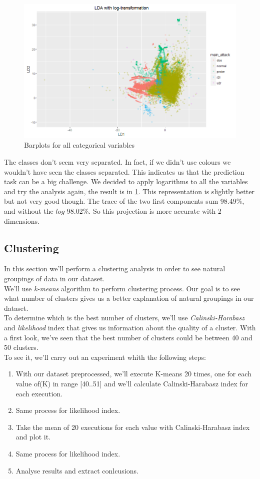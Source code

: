 \documentclass[a4paper]{article} %
\begin{document}
\begin{figure}[H]
	\centering
	\includegraphics[scale=0.45]{LDA_log.png}
	\caption{Barplots for all categorical variables}
	\label{fig:fda_log}
\end{figure}
The classes don't seem very separated. In fact, if we didn't use colours we wouldn't have seen the classes separated. This indicates us that the prediction task can be a big challenge. We decided to apply logarithms to all the variables and try the analysis again, the result is in \ref{fig:fda_log}. This representation is slightly better but not very good though. The trace of the two first components sum 98.49\%, and without the $log$ 98.02\%. So this projection is more accurate with 2 dimensions. 

\subsection{Clustering}
In this section we'll perform a clustering analysis in order to see natural groupings of data in our dataset.  \\
We'll use \textit{k-means} algorithm to perform clustering process. Our goal is to see what number of clusters gives us a better explanation of natural groupings in our dataset. \\
To determine which is the best number of clusters, we'll use \textit{Calinski-Harabasz} and  \textit{likelihood} index that gives us information about the quality of a cluster.
With a first look, we've seen that the best number of clusters could be between 40 and 50 clusters. \\
To see it, we'll carry out an experiment whith the following steps:
\begin{enumerate}
	\item With our dataset preprocessed, we'll execute K-means 20 times, one for each value of(K) in range [40..51] and we'll calculate Calinski-Harabasz index for each execution.
	\item Same process for likelihood index.
	\item Take the mean of 20 executions for each value with Calinski-Harabasz index and plot it.
	\item Same process for likelihood index.
	\item Analyse results and extract conlcusions.
\end{enumerate}
\end{document}
